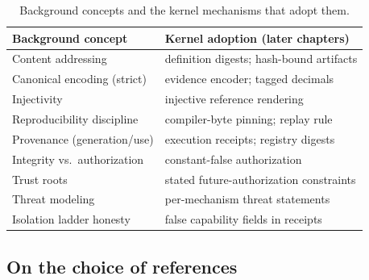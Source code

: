 \begin{table}[htbp]
\centering
\caption{Background concepts and the kernel mechanisms that adopt
them.}
\label{ch02:tab-map}
\begin{tabular}{@{}ll@{}}
\toprule
Background concept & Kernel adoption (later chapters) \\
\midrule
Content addressing & definition digests; hash-bound artifacts \\
Canonical encoding (strict) & evidence encoder; tagged decimals \\
Injectivity & injective reference rendering \\
Reproducibility discipline & compiler-byte pinning; replay rule \\
Provenance (generation/use) & execution receipts; registry digests \\
Integrity vs.\ authorization & constant-false authorization \\
Trust roots & stated future-authorization constraints \\
Threat modeling & per-mechanism threat statements \\
Isolation ladder honesty & false capability fields in receipts \\
\bottomrule
\end{tabular}
\end{table}

\subsection{On the choice of references}\label{ch02:refs-rationale}

